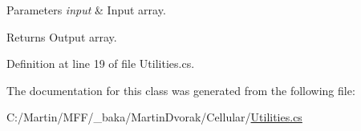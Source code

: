 \begin{DoxyParams}{Parameters}
{\em input} & Input array.\\
\hline
\end{DoxyParams}
\begin{DoxyReturn}{Returns}
Output array.
\end{DoxyReturn}


Definition at line 19 of file Utilities.\+cs.



The documentation for this class was generated from the following file\+:\begin{DoxyCompactItemize}
\item 
C\+:/\+Martin/\+M\+F\+F/\+\_\+baka/\+Martin\+Dvorak/\+Cellular/\hyperlink{_utilities_8cs}{Utilities.\+cs}\end{DoxyCompactItemize}
